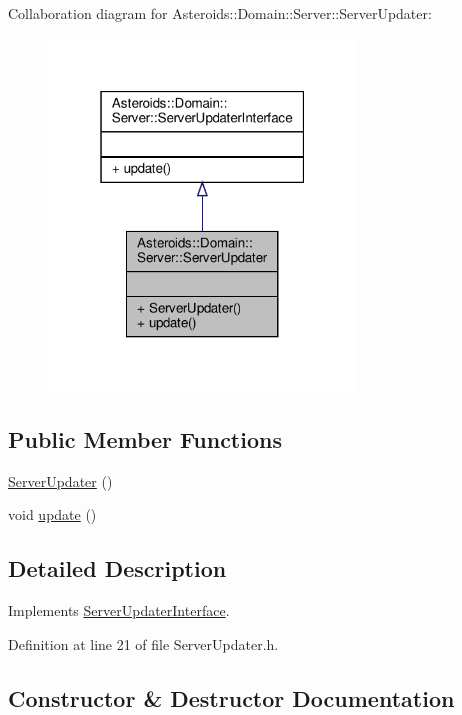 Collaboration diagram for Asteroids\+:\+:Domain\+:\+:Server\+:\+:Server\+Updater\+:\nopagebreak
\begin{figure}[H]
\begin{center}
\leavevmode
\includegraphics[width=232pt]{classAsteroids_1_1Domain_1_1Server_1_1ServerUpdater__coll__graph}
\end{center}
\end{figure}
\subsection*{Public Member Functions}
\begin{DoxyCompactItemize}
\item 
\hyperlink{classAsteroids_1_1Domain_1_1Server_1_1ServerUpdater_ab9241f0ac7cead01afc721b3b7bb46cd}{Server\+Updater} ()
\item 
void \hyperlink{classAsteroids_1_1Domain_1_1Server_1_1ServerUpdater_a9f4250008b2c855699c59945890e88cd}{update} ()
\end{DoxyCompactItemize}


\subsection{Detailed Description}
Implements \hyperlink{classAsteroids_1_1Domain_1_1Server_1_1ServerUpdaterInterface}{Server\+Updater\+Interface}. 

Definition at line 21 of file Server\+Updater.\+h.



\subsection{Constructor \& Destructor Documentation}
\mbox{\label{classAsteroids_1_1Domain_1_1Server_1_1ServerUpdater_ab9241f0ac7cead01afc721b3b7bb46cd}} 
